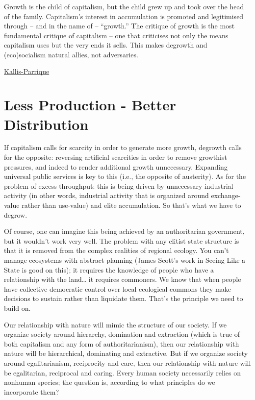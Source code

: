 \documentclass[
]{book}
\begin{document}
Growth is the child of capitalism, but the child grew up and took over the head of the family. Capitalism's interest in accumulation is promoted and legitimised through -- and in the name of -- ``growth.'' The critique of growth is the most fundamental critique of capitalism -- one that criticises not only the means capitalism uses but the very ends it sells. This makes degrowth and (eco)socialism natural allies, not adversaries.

\href{https://braveneweurope.com/timothee-parrique-giorgos-kallis-degrowth-socialism-without-growth}{Kallis-Parrique}

\hypertarget{less-production---better-distribution}{%
\section{Less Production - Better Distribution}\label{less-production---better-distribution}}

If capitalism calls for scarcity in order to generate more growth, degrowth calls for the opposite: reversing artificial scarcities in order to remove growthist pressures, and indeed to render additional growth unnecessary. Expanding universal public services is key to this (i.e., the opposite of austerity). As for the problem of excess throughput: this is being driven by unnecessary industrial activity (in other words, industrial activity that is organized around exchange-value rather than use-value) and elite accumulation. So that's what we have to degrow.

Of course, one can imagine this being achieved by an authoritarian government, but it wouldn't work very well. The problem with any elitist state structure is that it is removed from the complex realities of regional ecology. You can't manage ecosystems with abstract planning (James Scott's work in Seeing Like a State is good on this); it requires the knowledge of people who have a relationship with the land\ldots{} it requires commoners. We know that when people have collective democratic control over local ecological commons they make decisions to sustain rather than liquidate them. That's the principle we need to build on.

Our relationship with nature will mimic the structure of our society. If we organize society around hierarchy, domination and extraction (which is true of both capitalism and any form of authoritarianism), then our relationship with nature will be hierarchical, dominating and extractive. But if we organize society around egalitarianism, reciprocity and care, then our relationship with nature will be egalitarian, reciprocal and caring. Every human society necessarily relies on nonhuman species; the question is, according to what principles do we incorporate them?
\end{document}
